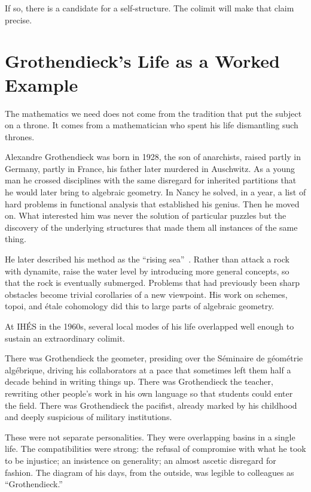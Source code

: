 \documentclass[12pt,a4paper]{article}
\begin{document}
If so, there is a candidate for a self-structure. The colimit will make that claim precise.

\section{Grothendieck's Life as a Worked Example}

The mathematics we need does not come from the tradition that put the subject on a throne. It comes from a mathematician who spent his life dismantling such thrones.

Alexandre Grothendieck was born in 1928, the son of anarchists, raised partly in Germany, partly in France, his father later murdered in Auschwitz. As a young man he crossed disciplines with the same disregard for inherited partitions that he would later bring to algebraic geometry. In Nancy he solved, in a year, a list of hard problems in functional analysis that established his genius. Then he moved on. What interested him was never the solution of particular puzzles but the discovery of the underlying structures that made them all instances of the same thing.

He later described his method as the ``rising sea''~\cite{mclarty}. Rather than attack a rock with dynamite, raise the water level by introducing more general concepts, so that the rock is eventually submerged. Problems that had previously been sharp obstacles become trivial corollaries of a new viewpoint. His work on schemes, topoi, and \'etale cohomology did this to large parts of algebraic geometry.

At IH\'ES in the 1960s, several local modes of his life overlapped well enough to sustain an extraordinary colimit.

There was Grothendieck the geometer, presiding over the S\'eminaire de g\'eom\'etrie alg\'ebrique, driving his collaborators at a pace that sometimes left them half a decade behind in writing things up. There was Grothendieck the teacher, rewriting other people's work in his own language so that students could enter the field. There was Grothendieck the pacifist, already marked by his childhood and deeply suspicious of military institutions.

These were not separate personalities. They were overlapping basins in a single life. The compatibilities were strong: the refusal of compromise with what he took to be injustice; an insistence on generality; an almost ascetic disregard for fashion. The diagram of his days, from the outside, was legible to colleagues as ``Grothendieck.''
\end{document}
